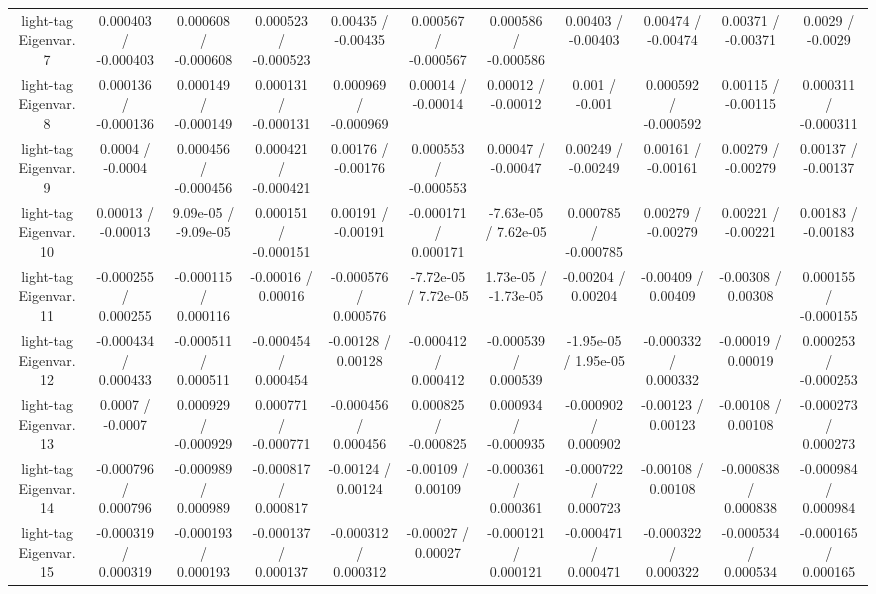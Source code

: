 \begin{table}[htbp]
\begin{center}
\begin{tabular}{|c|c|c|c|c|c|c|c|c|c|c|}
  light-tag Eigenvar. 7 & 0.000403 / -0.000403 & 0.000608 / -0.000608 & 0.000523 / -0.000523 & 0.00435 / -0.00435 & 0.000567 / -0.000567 & 0.000586 / -0.000586 & 0.00403 / -0.00403 & 0.00474 / -0.00474 & 0.00371 / -0.00371 & 0.0029 / -0.0029 \\ 
  light-tag Eigenvar. 8 & 0.000136 / -0.000136 & 0.000149 / -0.000149 & 0.000131 / -0.000131 & 0.000969 / -0.000969 & 0.00014 / -0.00014 & 0.00012 / -0.00012 & 0.001 / -0.001 & 0.000592 / -0.000592 & 0.00115 / -0.00115 & 0.000311 / -0.000311 \\ 
  light-tag Eigenvar. 9 & 0.0004 / -0.0004 & 0.000456 / -0.000456 & 0.000421 / -0.000421 & 0.00176 / -0.00176 & 0.000553 / -0.000553 & 0.00047 / -0.00047 & 0.00249 / -0.00249 & 0.00161 / -0.00161 & 0.00279 / -0.00279 & 0.00137 / -0.00137 \\ 
  light-tag Eigenvar. 10 & 0.00013 / -0.00013 & 9.09e-05 / -9.09e-05 & 0.000151 / -0.000151 & 0.00191 / -0.00191 & -0.000171 / 0.000171 & -7.63e-05 / 7.62e-05 & 0.000785 / -0.000785 & 0.00279 / -0.00279 & 0.00221 / -0.00221 & 0.00183 / -0.00183 \\ 
  light-tag Eigenvar. 11 & -0.000255 / 0.000255 & -0.000115 / 0.000116 & -0.00016 / 0.00016 & -0.000576 / 0.000576 & -7.72e-05 / 7.72e-05 & 1.73e-05 / -1.73e-05 & -0.00204 / 0.00204 & -0.00409 / 0.00409 & -0.00308 / 0.00308 & 0.000155 / -0.000155 \\ 
  light-tag Eigenvar. 12 & -0.000434 / 0.000433 & -0.000511 / 0.000511 & -0.000454 / 0.000454 & -0.00128 / 0.00128 & -0.000412 / 0.000412 & -0.000539 / 0.000539 & -1.95e-05 / 1.95e-05 & -0.000332 / 0.000332 & -0.00019 / 0.00019 & 0.000253 / -0.000253 \\ 
  light-tag Eigenvar. 13 & 0.0007 / -0.0007 & 0.000929 / -0.000929 & 0.000771 / -0.000771 & -0.000456 / 0.000456 & 0.000825 / -0.000825 & 0.000934 / -0.000935 & -0.000902 / 0.000902 & -0.00123 / 0.00123 & -0.00108 / 0.00108 & -0.000273 / 0.000273 \\ 
  light-tag Eigenvar. 14 & -0.000796 / 0.000796 & -0.000989 / 0.000989 & -0.000817 / 0.000817 & -0.00124 / 0.00124 & -0.00109 / 0.00109 & -0.000361 / 0.000361 & -0.000722 / 0.000723 & -0.00108 / 0.00108 & -0.000838 / 0.000838 & -0.000984 / 0.000984 \\ 
  light-tag Eigenvar. 15 & -0.000319 / 0.000319 & -0.000193 / 0.000193 & -0.000137 / 0.000137 & -0.000312 / 0.000312 & -0.00027 / 0.00027 & -0.000121 / 0.000121 & -0.000471 / 0.000471 & -0.000322 / 0.000322 & -0.000534 / 0.000534 & -0.000165 / 0.000165 \\ 

\end{tabular}
\end{center}
\end{table}
